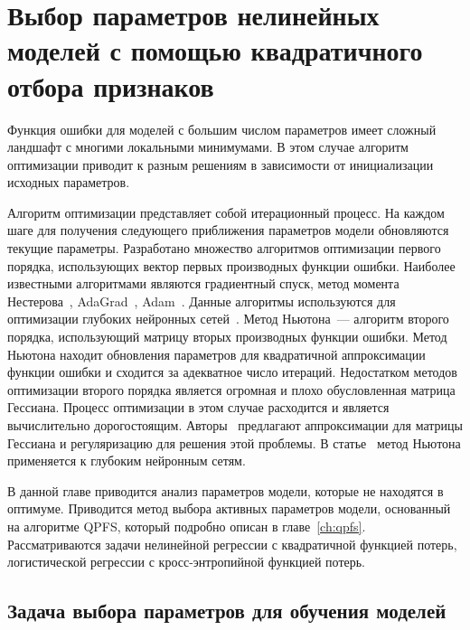\chapter{Выбор параметров нелинейных моделей с помощью квадратичного отбора признаков}
\label{ch:newton_qpfs}

Функция ошибки для моделей с большим числом параметров имеет сложный ландшафт с многими локальными минимумами.
В этом случае алгоритм оптимизации приводит к разным решениям в зависимости от инициализации исходных параметров.

Алгоритм оптимизации представляет собой итерационный процесс.
На каждом шаге для получения следующего приближения параметров модели обновляются текущие параметры.
Разработано множество алгоритмов оптимизации первого порядка, использующих вектор первых производных функции ошибки.
Наиболее известными алгоритмами являются градиентный спуск, 
метод момента Нестерова~\cite{nesterov1983momentum}, AdaGrad~\cite{duchi2011adagrad}, Adam~\cite{kingma2014adam}.
Данные алгоритмы используются для оптимизации глубоких нейронных сетей~\cite{goodfellow2016deeplearningbook}.
Метод Ньютона~--- алгоритм второго порядка, использующий матрицу вторых производных функции ошибки.
Метод Ньютона находит обновления параметров для квадратичной аппроксимации функции ошибки и сходится за адекватное число итераций.
Недостатком методов оптимизации второго порядка является огромная и плохо обусловленная матрица Гессиана.
Процесс оптимизации в этом случае расходится и является вычислительно дорогостоящим.
Авторы~\cite{avriel2003nonlinear,blaschke1997convergence} предлагают аппроксимации для матрицы Гессиана и регуляризацию для решения этой проблемы.
В статье~\cite{botev2017newtondeeplearning} метод Ньютона применяется к глубоким нейронным сетям.

В данной главе приводится анализ параметров модели, которые не находятся в оптимуме.
Приводится метод выбора активных параметров модели, основанный на алгоритме QPFS, который подробно описан в главе~\ref{ch:qpfs}.
Рассматриваются задачи нелинейной регрессии с квадратичной функцией потерь, логистической регрессии с кросс-энтропийной функцией потерь.  

\section{Задача выбора параметров для обучения моделей}
\label{sec:ch4:newton_qpfs_param_selection}

